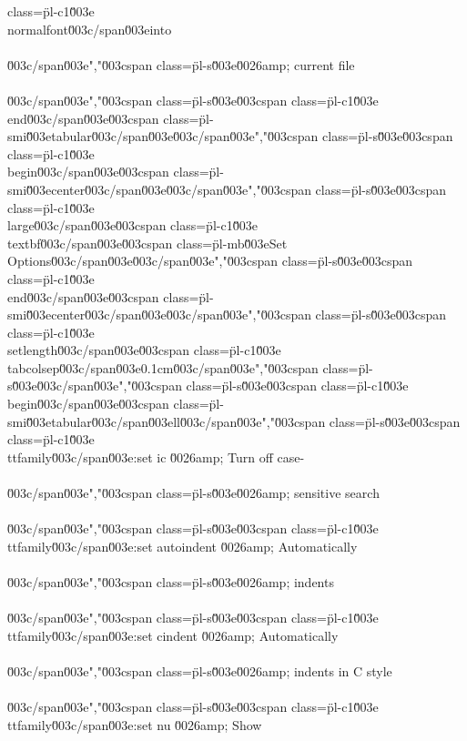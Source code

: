 class=\"pl-c1\"\u003e\\normalfont\u003c/span\u003e{into}\\\\\u003c/span\u003e","\u003cspan class=\"pl-s\"\u003e\u0026amp; current file\\\\\u003c/span\u003e","\u003cspan class=\"pl-s\"\u003e\u003cspan class=\"pl-c1\"\u003e\\end\u003c/span\u003e{\u003cspan class=\"pl-smi\"\u003etabular\u003c/span\u003e}\u003c/span\u003e","\u003cspan class=\"pl-s\"\u003e\u003cspan class=\"pl-c1\"\u003e\\begin\u003c/span\u003e{\u003cspan class=\"pl-smi\"\u003ecenter\u003c/span\u003e}\u003c/span\u003e","\u003cspan class=\"pl-s\"\u003e\u003cspan class=\"pl-c1\"\u003e\\large\u003c/span\u003e\u003cspan class=\"pl-c1\"\u003e\\textbf\u003c/span\u003e{\u003cspan class=\"pl-mb\"\u003eSet Options\u003c/span\u003e}\u003c/span\u003e","\u003cspan class=\"pl-s\"\u003e\u003cspan class=\"pl-c1\"\u003e\\end\u003c/span\u003e{\u003cspan class=\"pl-smi\"\u003ecenter\u003c/span\u003e}\u003c/span\u003e","\u003cspan class=\"pl-s\"\u003e\u003cspan class=\"pl-c1\"\u003e\\setlength\u003c/span\u003e{\u003cspan class=\"pl-c1\"\u003e\\tabcolsep\u003c/span\u003e}{0.1cm}\u003c/span\u003e","\u003cspan class=\"pl-s\"\u003e\u003c/span\u003e","\u003cspan class=\"pl-s\"\u003e\u003cspan class=\"pl-c1\"\u003e\\begin\u003c/span\u003e{\u003cspan class=\"pl-smi\"\u003etabular\u003c/span\u003e}{ll}\u003c/span\u003e","\u003cspan class=\"pl-s\"\u003e\u003cspan class=\"pl-c1\"\u003e\\ttfamily\u003c/span\u003e{:set ic} \u0026amp; Turn off case-\\\\\u003c/span\u003e","\u003cspan class=\"pl-s\"\u003e\u0026amp; sensitive search\\\\\u003c/span\u003e","\u003cspan class=\"pl-s\"\u003e\u003cspan class=\"pl-c1\"\u003e\\ttfamily\u003c/span\u003e{:set autoindent} \u0026amp; Automatically\\\\\u003c/span\u003e","\u003cspan class=\"pl-s\"\u003e\u0026amp; indents\\\\\u003c/span\u003e","\u003cspan class=\"pl-s\"\u003e\u003cspan class=\"pl-c1\"\u003e\\ttfamily\u003c/span\u003e{:set cindent} \u0026amp; Automatically\\\\\u003c/span\u003e","\u003cspan class=\"pl-s\"\u003e\u0026amp; indents in C style\\\\\u003c/span\u003e","\u003cspan class=\"pl-s\"\u003e\u003cspan class=\"pl-c1\"\u003e\\ttfamily\u003c/span\u003e{:set nu} \u0026amp; Show 